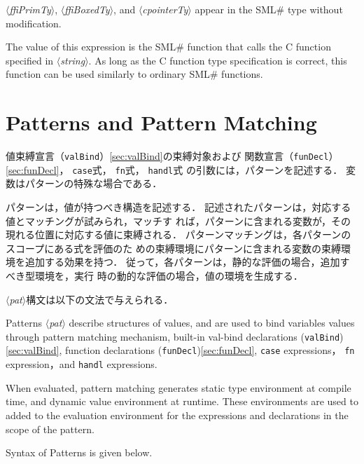 \documentclass{jbook}
\newcommand{\txt}[2]{#2}
\newcommand{\smlsharp}{SML\#}
\newcommand{\code}[1]{\mbox{\large\tt #1}}
\newcommand{\nonterm}[1]{\mbox{$\langle$}{\it #1}\mbox{$\rangle$}}
\begin{document}
\nonterm{ffiPrimTy}, \nonterm{ffiBoxedTy}, and \nonterm{cpointerTy}
appear in the \smlsharp{} type without modification.

	The value of this expression is the \smlsharp{} function
that calls the C function specified in \nonterm{string}.
	As long as the C function type specification is correct,
this function can be used similarly to ordinary \smlsharp{} functions.
\fi%


\chapter{\txt{パターンとパターンマッチング}{Patterns and Pattern Matching}}

\ifjp%

	値束縛宣言（\code{valBind}）\ref{sec:valBind}の束縛対象および
関数宣言（\code{funDecl}）\ref{sec:funDecl}，
\code{case}式，
\code{fn}式，
\code{handl}式
の引数には，パターンを記述する．
	変数はパターンの特殊な場合である．

	パターンは，値が持つべき構造を記述する．
	記述されたパターンは，対応する値とマッチングが試みられ，マッチす
れば，パターンに含まれる変数が，その現れる位置に対応する値に束縛される．
	パターンマッチングは，各パターンのスコープにある式を評価のた
めの束縛環境にパターンに含まれる変数の束縛環境を追加する効果を持つ．
	従って，各パターンは，静的な評価の場合，追加すべき型環境を，実行
時の動的な評価の場合，値の環境を生成する．

\nonterm{pat}構文は以下の文法で与えられる．
\else%

	Patterns \nonterm{pat} describe structures of values, and are
used to bind variables values through pattern matching mechanism, built-in
val-bind declarations (\code{valBind})\ref{sec:valBind}, 
function declarations (\code{funDecl})\ref{sec:funDecl},
\code{case} expressions，
\code{fn} expression，and
\code{handl} expressions.

	When evaluated, pattern matching generates static type
environment at compile time, and dynamic value environment at runtime.
	These environments are used to added to the evaluation
environment for the expressions and declarations in the scope of the
pattern.

	Syntax of Patterns is given below.
\fi%
\end{document}
